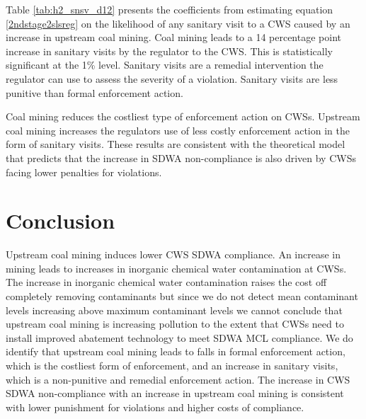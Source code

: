 \documentclass{article}
\begin{document}
Table \ref{tab:h2_snsv_d12} presents the coefficients from estimating equation \ref{2ndstage2slsreg} on the likelihood of any sanitary visit to a CWS caused by an increase in upstream coal mining. Coal mining leads to a 14 percentage point increase in sanitary visits by the regulator to the CWS. This is statistically significant at the 1\% level. Sanitary visits are a remedial intervention the regulator can use to assess the severity of a violation. Sanitary visits are less punitive than formal enforcement action.

Coal mining reduces the costliest type of enforcement action on CWSs. Upstream coal mining increases the regulators use of less costly enforcement action in the form of sanitary visits. These results are consistent with the theoretical model that predicts that the increase in SDWA non-compliance is also driven by CWSs facing lower penalties for violations.





\section{Conclusion}

Upstream coal mining induces lower CWS SDWA compliance. An increase in mining leads to increases in inorganic chemical water contamination at CWSs. The increase in inorganic chemical water contamination raises the cost off completely removing contaminants but since we do not detect mean contaminant levels increasing above maximum contaminant levels we cannot conclude that upstream coal mining is increasing pollution to the extent that CWSs need to install improved abatement technology to meet SDWA MCL compliance. We do identify that upstream coal mining leads to falls in formal enforcement action, which is the costliest form of enforcement, and an increase in sanitary visits, which is a non-punitive and remedial enforcement action. The increase in CWS SDWA non-compliance with an increase in upstream coal mining is consistent with lower punishment for violations and higher costs of compliance.

\newpage

\printbibliography
\end{document}
